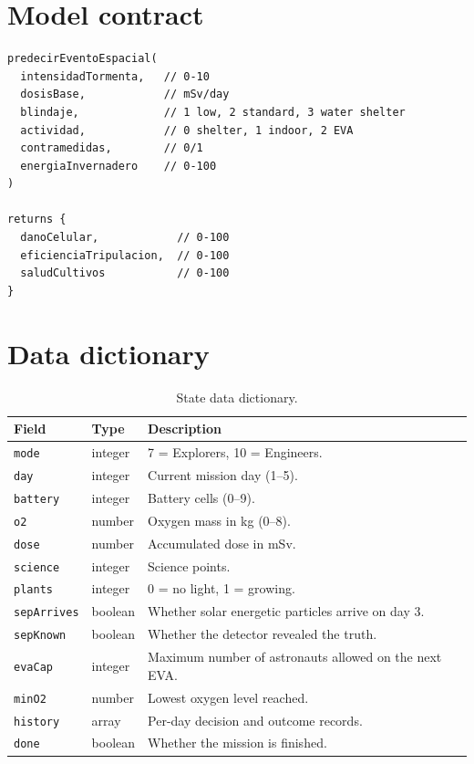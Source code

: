 \documentclass[11pt,a4paper]{article}
\newcommand{\code}[1]{\texttt{#1}}
\begin{document}
\section{Model contract}

\begin{verbatim}
predecirEventoEspacial(
  intensidadTormenta,   // 0-10
  dosisBase,            // mSv/day
  blindaje,             // 1 low, 2 standard, 3 water shelter
  actividad,            // 0 shelter, 1 indoor, 2 EVA
  contramedidas,        // 0/1
  energiaInvernadero    // 0-100
)

returns {
  danoCelular,            // 0-100
  eficienciaTripulacion,  // 0-100
  saludCultivos           // 0-100
}
\end{verbatim}

\section{Data dictionary}

\begin{table}[H]
\centering
\small
\begin{tabular}{@{}p{3.6cm}p{3.0cm}p{7.8cm}@{}}
\toprule
\textbf{Field} & \textbf{Type} & \textbf{Description}\\
\midrule
\code{mode} & integer & 7 = Explorers, 10 = Engineers.\\
\code{day} & integer & Current mission day (1--5).\\
\code{battery} & integer & Battery cells (0--9).\\
\code{o2} & number & Oxygen mass in kg (0--8).\\
\code{dose} & number & Accumulated dose in mSv.\\
\code{science} & integer & Science points.\\
\code{plants} & integer & 0 = no light, 1 = growing.\\
\code{sepArrives} & boolean & Whether solar energetic particles arrive on day 3.\\
\code{sepKnown} & boolean & Whether the detector revealed the truth.\\
\code{evaCap} & integer & Maximum number of astronauts allowed on the next EVA.\\
\code{minO2} & number & Lowest oxygen level reached.\\
\code{history} & array & Per-day decision and outcome records.\\
\code{done} & boolean & Whether the mission is finished.\\
\bottomrule
\end{tabular}
\caption{State data dictionary.}
\label{tab:state}
\end{table}
\end{document}
